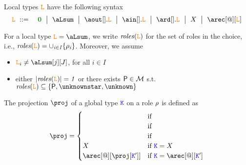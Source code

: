 Local types $\texttt{\textcolor{orange}L}$ have the following syntax
\begin{eqnarray*}
  \aL & \bnfdef & \nil \bnfmid
                  \aLsum \bnfmid
                  \aout[].\aL \bnfmid
                  \ain[].\aL \bnfmid
                  \ard[].\aL \bnfmid
                  X \bnfmid
                  \arec[@][\aL]
\end{eqnarray*}

For a local type $\aL = \aLsum$, we write $\it{roles}(\texttt{\textcolor{orange}L})$ for the set of roles in the 
choice, i.e., $\it{roles}(\texttt{\textcolor{orange}L}) = \cup_{i\in I}{\{\rho_i\}}$. Moreover, we assume
\begin{itemize}
\item $\aL_i \neq\aLsum[j][J]$, for all $i \in I$
\item either $| \it{roles}(\texttt{\textcolor{orange}L})| = 1$ or   
	there exists $\amulti P\in\multiroles$ s.t. $\sumRoles \aL \subseteq \{\amulti P, \unknownstar, \unknown\}$
\end{itemize}

The projection $\proj$ of a global type $\texttt{\textcolor{blue}K}$ on a role $\rho$ is
defined as
\[
  \proj =
  \begin{cases}
    & \text{if } \\
    & \text{if } \\
    & \text{if } \\
    X & \text{if } \aK = X \\
    \arec[@][{\proj[\aK']}] & \text{if } \aK = \arec[@][\aK']
  \end{cases}
\]


